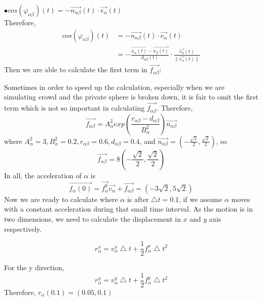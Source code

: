 $\bullet cos(\varphi_{\alpha\beta})(t)= -\overrightarrow{n_{\alpha \beta}}(t)\cdot\overrightarrow{e_{\alpha}}(t)$\\

Therefore,
\begin{equation}
\begin{split}
cos(\varphi_{\alpha\beta})(t)&= -\overrightarrow{n_{\alpha \beta}}(t)\cdot\overrightarrow{e_{\alpha}}(t)\\
&=-\frac{\overrightarrow{x_{\alpha}(t)}-\overrightarrow{x_{\beta}(t)}}{d_{\alpha \beta}(t)}\cdot\frac{\overrightarrow{v_{\alpha}}(t)}{\parallel \overrightarrow{v_{\alpha}}(t)\parallel}
\end{split}
\end{equation}
Then we are able to calculate the first term in $ \overrightarrow{f_{\alpha\beta}} $:

Sometimes in order to speed up the calculation, especially when we are simulating crowd and the private sphere is broken down, it is fair to omit the first term which is not so important in calculating $\overrightarrow{f_{\alpha \beta}}$.
Therefore,
 \begin{equation}
 \overrightarrow{f_{\alpha \beta}} = A^{2}_{\alpha} exp(\frac{r_{\alpha\beta}-d_{\alpha\beta}}{B^{2}_{\alpha}})\overrightarrow{n_{\alpha \beta}}
 \end{equation}
where $A^{2}_{\alpha}=3, B^{2}_{\alpha}=0.2, r_{\alpha\beta}=0.6, d_{\alpha\beta}=0.4$, and $\overrightarrow{n_{\alpha \beta}}=(-\frac{\sqrt{2}}{2}, \frac{\sqrt{2}}{2})$,
so 
 \begin{equation}
 \overrightarrow{f_{\alpha \beta}} = 8(-\frac{\sqrt{2}}{2}, \frac{\sqrt{2}}{2})
 \end{equation}
In all, the acceleration of $\alpha$ is 
 \begin{equation}
 \overrightarrow{f_{\alpha}(0)} = \overrightarrow{f^{0}_{\alpha}}\overrightarrow{v_{\alpha}} + \overrightarrow{f_{\alpha\beta}} = (-3\sqrt{2}, 5\sqrt{2})
 \end{equation}
Now we are ready to calculate where $\alpha$ is after $\bigtriangleup t=0.1$, if we assume $\alpha$ moves with a constant acceleration during that small time interval.
As the motion is in two dimensions, we need to calculate the displacement in $x$ and $y$ axis respectively.

 \begin{equation}
 r^{x}_{\alpha} = v^{x}_{\alpha} \bigtriangleup t + \frac{1}{2} f^{x}_{\alpha} \bigtriangleup t ^{2}
 \end{equation}
 
 For the y direction,
  \begin{equation}
 r^{y}_{\alpha} = v^{y}_{\alpha} \bigtriangleup t + \frac{1}{2} f^{y}_{\alpha} \bigtriangleup t ^{2}
 \end{equation}
 Therefore, $r_{\alpha}(0.1)= (0.05, 0.1)$



